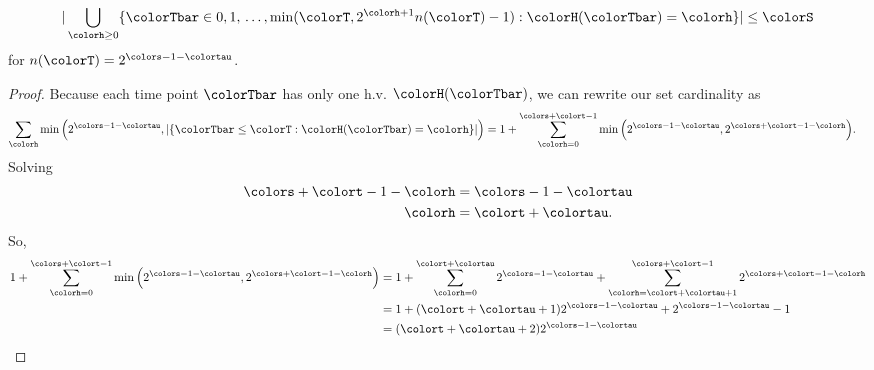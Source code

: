 \begin{lemma}
\label{thm:stretched-first-n-space}

\begin{align*}
|\bigcup_{\colorh \geq 0}
\{ \colorTbar \in 0, 1, \, \ldots, \min(\colorT, 2^{\colorh + 1}n(\colorT) - 1) : \colorH(\colorTbar) = \colorh \}| \leq \colorS
\end{align*}
for $n(\colorT) = 2^{\colors - 1 - \colortau}$.
\end{lemma}
\begin{proof}

Because each time point $\colorTbar$ has only one h.v. $\colorH(\colorTbar)$, we can rewrite our set cardinality as
\begin{align*}
\sum_{\colorh} \min\Big(2^{\colors - 1 - \colortau}, |\{ \colorTbar \leq \colorT : \colorH(\colorTbar) = \colorh \}|\Big)
&=
1 + \sum_{\colorh=0}^{\colors + \colort - 1} \min\Big(2^{\colors - 1 - \colortau}, 2^{\colors + \colort - 1 - \colorh}\Big).
\end{align*}
Solving
\begin{align*}
\colors + \colort - 1 - \colorh &= \colors - 1 - \colortau\\
\colorh &= \colort + \colortau.
\end{align*}
So,
\begin{align*}
1 + \sum_{\colorh=0}^{\colors + \colort - 1} \min\Big(2^{\colors - 1 - \colortau}, 2^{\colors + \colort - 1 - \colorh}\Big)
&=
1 + \sum_{\colorh=0}^{\colort + \colortau} 2^{\colors - 1 - \colortau} + \sum_{\colorh=\colort + \colortau + 1}^{\colors + \colort - 1} 2^{\colors + \colort - 1 - \colorh}\\
&=
1 + (\colort + \colortau + 1) 2^{\colors - 1 - \colortau} + 2^{\colors - 1 - \colortau} - 1\\
&=
(\colort + \colortau + 2) 2^{\colors - 1 - \colortau}\\

\end{align*}
\end{proof}
